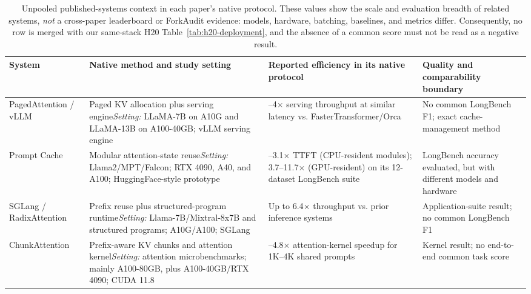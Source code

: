 \begin{table}[H]
\caption{Unpooled published-systems context in each paper's native protocol.  These values show the scale and evaluation breadth of related systems, \emph{not} a cross-paper leaderboard or ForkAudit evidence: models, hardware, batching, baselines, and metrics differ.  Consequently, no row is merged with our same-stack H20 Table~\ref{tab:h20-deployment}, and the absence of a common score must not be read as a negative result.}
\label{tab:published-context}
\centering\scriptsize
\setlength{\tabcolsep}{2.5pt}
\begin{tabular}{@{}>{\raggedright\arraybackslash}p{}>{\raggedright\arraybackslash}p{}>{\raggedright\arraybackslash}p{}>{\raggedright\arraybackslash}p{}@{}}
\toprule
System & Native method and study setting & Reported efficiency in its native protocol & Quality and comparability boundary \\
\midrule
PagedAttention / vLLM~\citep{kwon2023pagedattention} & Paged KV allocation plus serving engine\newline \textit{Setting:} LLaMA-7B on A10G and LLaMA-13B on A100-40GB; vLLM serving engine & 2--4$\times$ serving throughput at similar latency vs. FasterTransformer/Orca & No common LongBench F1; exact cache-management method \\
Prompt Cache~\citep{gim2024promptcache} & Modular attention-state reuse\newline \textit{Setting:} Llama2/MPT/Falcon; RTX 4090, A40, and A100; HuggingFace-style prototype & 1.5--3.1$\times$ TTFT (CPU-resident modules); 3.7--11.7$\times$ (GPU-resident) on its 12-dataset LongBench suite & LongBench accuracy evaluated, but with different models and hardware \\
SGLang / RadixAttention~\citep{zheng2024sglang} & Prefix reuse plus structured-program runtime\newline \textit{Setting:} Llama-7B/Mixtral-8x7B and structured programs; A10G/A100; SGLang & Up to 6.4$\times$ throughput vs. prior inference systems & Application-suite result; no common LongBench F1 \\
ChunkAttention~\citep{ye2024chunkattention} & Prefix-aware KV chunks and attention kernel\newline \textit{Setting:} attention microbenchmarks; mainly A100-80GB, plus A100-40GB/RTX 4090; CUDA 11.8 & 3.2--4.8$\times$ attention-kernel speedup for 1K--4K shared prompts & Kernel result; no end-to-end common task score \\

\end{tabular}
\end{table}
